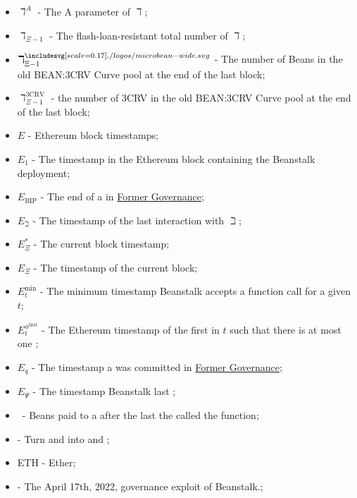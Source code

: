 \documentclass[class=article, crop=false]{standalone}
\begin{document}
\begin{itemize}[topsep=0pt, itemsep=3pt,leftmargin=16pt]
    \item[] $\daleth^{A}$ - \hypertarget{ht65}{The A parameter of $\daleth$};
    \item[] $\daleth_{\Xi-1}$ - \hypertarget{ht66}{The flash-loan-resistant total number of $\daleth$};
    \item[] $\daleth_{\Xi-1}^{\bean}$ - \hypertarget{ht67}{The number of Beans in the old BEAN:3CRV Curve pool at the end of the last block};
    \item[] $\daleth_{\Xi-1}^{\text{3CRV}}$ - \hypertarget{ht68}{the number of 3CRV in the old BEAN:3CRV Curve pool at the end of the last block};
    \item[] $E$ - \hypertarget{ht69}{Ethereum block timestamps};
    \item[] $E_1$ - \hypertarget{ht70}{The timestamp in the Ethereum block containing the Beanstalk deployment};
    \item[] $E_{\text{BIP}}$ - \hypertarget{ht71}{The end of a   in \hyperlink{subsection.14.3}{Former Governance}};
    \item[] $E_{\beth}$ - \hypertarget{ht72}{The timestamp of the last interaction with $\beth$};
    \item[] $E_{\Xi}^*$ - \hypertarget{ht73}{The current block timestamp};
    \item[] $E_\Xi$ - The timestamp of the current block;
    \item[] $E_{t}^{\text{min}}$ - \hypertarget{ht75}{The minimum timestamp Beanstalk accepts a  function call for a given $t$};
    \item[] $E_{t}^{u^{\text{first}}}$ - \hypertarget{ht76}{The Ethereum timestamp of the first  in $t$ such that there is at most one };
    \item[] $E_q$ - \hypertarget{ht77}{The timestamp a  was committed in \hyperlink{subsection.14.3}{Former Governance}};
    \item[] $E_{\Psi}$ - \hypertarget{ht78}{The timestamp Beanstalk last };
    \item[]  \Bean\ - \hypertarget{ht79}{Beans paid to a  after the last  the  called the  function};
    \item[]  - \hypertarget{ht80}{Turn  and  into  and };
    \item[] ETH - \hypertarget{ht81}{Ether};
    \item[]  - \hypertarget{ht82}{The April 17th, 2022, governance exploit of Beanstalk.};

\end{itemize}
\end{document}
